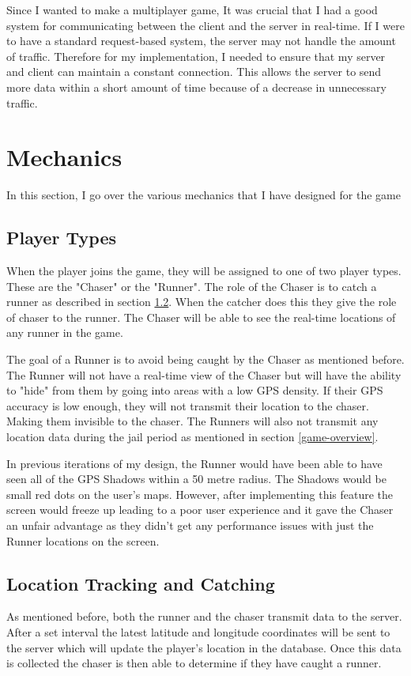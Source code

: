\documentclass{l4proj}
\begin{document}
Since I wanted to make a multiplayer game, It was crucial that I had a good system for communicating between the client and the server
in real-time. If I were to have a standard request-based system, the server may not handle the amount of traffic. Therefore for my implementation,
I needed to ensure that my server and client can maintain a constant connection. This allows the server to send more data within a short amount of
time because of a decrease in unnecessary traffic.
\section{Mechanics}
In this section, I go over the various mechanics that I have designed for the game

\subsection{Player Types}
\label{playertypes}
When the player joins the game, they will be assigned to one of two player types. These are the "Chaser" or the "Runner".
The role of the Chaser is to catch a runner as described in section \ref{catching}. When the catcher does this they give the role of chaser to the runner. The Chaser
will be able to see the real-time locations of any runner in the game.

The goal of a Runner is to avoid being caught by the Chaser as mentioned before. The Runner will not have a real-time
view of the Chaser but will have the ability to "hide" from them by going into areas with a low GPS density. If their
GPS accuracy is low enough, they will not transmit their location to the chaser. Making them invisible to the chaser.
The Runners will also not transmit any location data during the jail period as mentioned in section \ref{game-overview}.

In previous iterations of my design, the Runner would have been able to have seen all of the GPS Shadows within a 50
metre radius. The Shadows would be small red dots on the user's maps. However, after implementing this feature the screen
would freeze up leading to a poor user experience and it gave the Chaser an unfair advantage as they didn't get any
performance issues with just the Runner locations on the screen.

\subsection{Location Tracking and Catching}
\label{catching}
As mentioned before, both the runner and the chaser transmit data to the server. After a set interval
the latest latitude and longitude coordinates will be sent to the server which will update the player's location
in the database. Once this data is collected the chaser is then able to determine if they have caught a runner.
\end{document}
